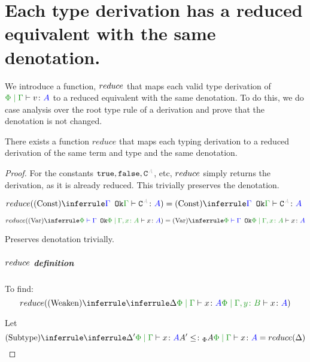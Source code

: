 \documentclass{report}
\begin{document}
    \section{Each type derivation has a reduced equivalent with the same denotation.}
    We introduce a function, $reduce$ that maps each valid type derivation of $\gpetyperelation{v}{A}$ to a reduced equivalent with the same denotation. To do this, we do case analysis over the root type rule of a derivation and prove that the denotation is not changed.
\begin{theorem}
    There exists a function $reduce$ that maps each typing derivation to a reduced derivation of the same term and type and the same denotation.
\end{theorem}
\begin{framed}
    \begin{proof}
        
                    For the constants $\t, \f, \const{A}$, etc, $reduce$ simply returns the derivation, as it is already reduced. This trivially preserves the denotation.
        
                    $\reduce(\truleconst) = \truleconst$
        
                    \begin{equation}
                        \reduce(\ntreeruleI{Var}{\wellformedok{\P}{\G}}{\etyperelation{\P}{\gax}{x}{A}}) =  \ntreeruleI{Var}{\wellformedok{\P}{\G}}{\etyperelation{\P}{\gax}{x}{A}}
                    \end{equation}
        
                    Preserves denotation trivially.
        
                    \subparagraph{$reduce$ definition}
                    To find:
                    \begin{equation}
                        \reduce(\ntreeruleI{Weaken}{\treeruleI{\D}{\gpetyperelation{x}{A}}}{\etyperelation{\P}{\gby}{x}{A}})
                    \end{equation}
        
                    Let 
                    \begin{equation}\label{WeakenDeltaReduction}
                        \ntreeruleII{Subtype}{\treeruleI{\D'}{\gpetyperelation{x}{A}}}{ A'\subtypep A}{\gpetyperelation{x}{A}} = \reduce(\D)
                    \end{equation}
        

\end{proof}
\end{framed}
\end{document}
